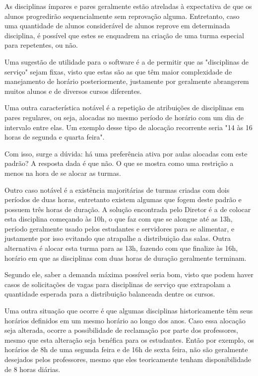         As disciplinas ímpares e pares geralmente estão atreladas à expectativa de que os alunos progredirão sequencialmente sem reprovação alguma. Entretanto, caso uma quantidade de alunos considerável de alunos reprove em determinada disciplina, é possível que estes se enquadrem na criação de uma turma especial para repetentes, ou não.

        Uma sugestão de utilidade para o software é a de permitir que as "disciplinas de serviço" sejam fixas, visto que estas são as que têm maior complexidade de manejamento de horário posteriormente, justamente por geralmente abrangerem muitos alunos e de diversos cursos diferentes.

        Uma outra característica notável é a repetição de atribuições de disciplinas em pares regulares, ou seja, alocadas no mesmo período de horário com um dia de intervalo entre elas. Um exemplo desse tipo de alocação recorrente seria "14 às 16 horas de segunda e quarta feira".

        Com isso, surge a dúvida: há uma preferência ativa por aulas alocadas com este padrão? A resposta dada é que não. O que se mostra como uma restrição a menos na hora de se alocar as turmas.

        Outro caso notável é a existência majoritárias de turmas criadas com dois períodos de duas horas, entretanto existem algumas que fogem deste padrão e possuem três horas de duração. A solução encontrada pelo Diretor é a de colocar esta disciplina começando às 10h, o que faz com que se alongue até as 13h, período geralmente usado pelos estudantes e servidores para se alimentar, e justamente por isso evitando que atrapalhe a distribuição das salas. Outra alternativa é alocar esta turma para as 13h, fazendo com que finalize às 16h, horário em que as disciplinas com duas horas de duração geralmente terminam.

        Segundo ele, saber a demanda máxima possível seria bom, visto que podem haver casos de solicitações de vagas para disciplinas de serviço que extrapolam a quantidade esperada para a distribuição balanceada dentre os cursos.

        Uma outra situação que ocorre é que algumas disciplinas historicamente têm seus horários definidos em um mesmo horário ao longo dos anos. Caso essa alocação seja alterada, ocorre a possibilidade de reclamação por parte dos professores, mesmo que esta alteração seja benéfica para os estudantes. Então por exemplo, os horários de 8h de uma segunda feira e de 16h de sexta feira, não são geralmente desejados pelos professores, mesmo que eles teoricamente tenham disponibilidade de 8 horas diárias.

